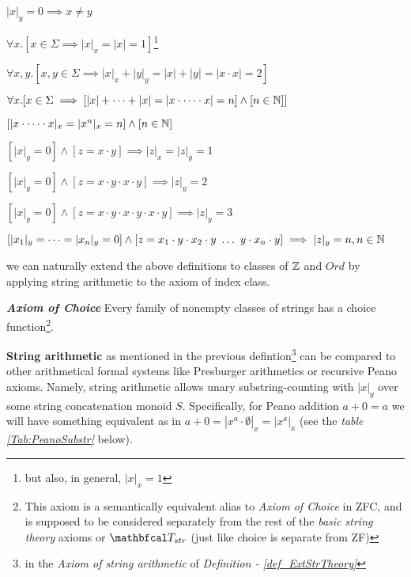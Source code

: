 \begin{definition}
\begin{legal}
\begin{legal}
\begin{legal}
        \item $|x|_y = 0 \implies x \neq y$
        \item $\forall x.[x \in \Sigma \implies |x|_x = |x| = 1]$\footnote{but also, in general, $|x|_x = 1$}
        \item $\forall x,y.[x,y \in \Sigma \implies |x|_x + |y|_y = |x| + |y| = |x \cdot x| = 2]$
        \item $\forall x.[x \in \Sigma \implies [|x| + \dots + |x|= |x \cdot \dots \cdot x| = n] \land [n \in \mathbb{N}]] $
        \item $[|x \cdot \dots \cdot x|_x = |x^n|_x = n] \land [n \in \mathbb{N}]$
        \item $[|x|_y = 0] \land [ z = x \cdot y] \implies |z|_x = |z|_y = 1$
        \item $[|x|_y = 0] \land [ z = x \cdot y \cdot x \cdot y] \implies |z|_y = 2$
        \item $[|x|_y = 0] \land [ z = x \cdot y \cdot x \cdot y \cdot x \cdot y] \implies |z|_y = 3$
        \item $[|x_1|_y = \dots = |x_n|_y = 0] \land [ z = x_1 \cdot y \cdot x_2 \cdot y\ \dots\ y \cdot x_n \cdot y] \implies |z|_y = n, n \in \mathbb{N}$
      \end{legal}
      \item we can naturally extend the above definitions to classes of $\mathbb{Z}$ and $Ord$ by applying string arithmetic to the axiom of index class. %
    \end{legal}
    \item \textbf{\textit{Axiom of Choice}} Every family of nonempty classes of strings has a choice function\footnote{This axiom is a semantically equivalent alias to \textit{Axiom of Choice} in ZFC, and is supposed to be considered separately from the rest of the \textit{basic string theory} axioms or $\LsT_{str}$ (just like choice is separate from ZF)}.
  \end{legal}
\end{definition}

\textbf{String arithmetic} as mentioned in the previous defintion\footnote{in the \textit{Axiom of string arithmetic} of \textit{Definition - \ref{def_ExtStrTheory}}} can be compared to other arithmetical formal systems like Presburger arithmetics or recursive Peano axioms\cite{jech2003set}. Namely, string arithmetic allows unary substring-counting with $|x|_y$ over some string concatenation monoid $S$. Specifically, for Peano addition $a + 0 = a$ we will have something equivalent as in $a + 0 = |x^a \cdot \emptyset|_x = |x^a|_x$ (see the \textit{table \ref{Tab:PeanoSubstr}} below).

